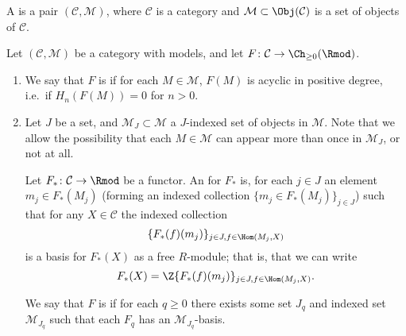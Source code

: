 \documentclass[main.tex]{subfiles}
\begin{document}
\begin{definition}
  \label{def:category_with_models}
  A  is a pair $(\mathcal{C}, \mathcal{M})$, where $\mathcal{C}$ is a category and $\mathcal{M} \subset \Obj(\mathcal{C})$ is a set of objects of $\mathcal{C}$.
\end{definition}

\begin{definition}
  \label{def:free_acyclic_functor}
  Let $(\mathcal{C}, \mathcal{M})$ be a category with models, and let $F\colon \mathcal{C} \to \Ch_{\geq 0}(\Rmod)$.

  \begin{enumerate}
    \item We say that $F$ is  if for each $M \in \mathcal{M}$, $F(M)$ is acyclic in positive degree, i.e.\ if $H_{n}(F(M)) = 0$ for $n > 0$.

    \item Let $J$ be a set, and $\mathcal{M}_{J} \subset \mathcal{M}$ a $J$-indexed set of objects in $\mathcal{M}$. Note that we allow the possibility that each $M \in \mathcal{M}$ can appear more than once in \(\mathcal{M}_{J}\), or not at all.

      Let $F_{*}\colon \mathcal{C} \to \Rmod$ be a functor. An  for $F_{*}$ is, for each $j \in J$ an element $m_{j} \in F_{*}(M_{j})$ (forming an indexed collection $\{m_{j} \in F_{*}(M_{j})\}_{j \in J}$) such that for any $X \in \mathcal{C}$ the indexed collection
      \begin{equation*}
        \{F_{*}(f)(m_{j})\}_{j \in J, f \in \Hom(M_{j}, X)}
      \end{equation*}
      is a basis for $F_{*}(X)$ as a free $R$-module; that is, that we can write
      \begin{equation*}
        F_{*}(X) = \Z\{F_{*}(f)(m_{j})\}_{j \in J, f \in \Hom(M_{j}, X)}.
      \end{equation*}

      We say that $F$ is  if for each $q \geq 0$ there exists some set $J_{q}$ and indexed set $\mathcal{M}_{J_{q}}$ such that each $F_{q}$ has an $\mathcal{M}_{J_{q}}$-basis.
  \end{enumerate}
\end{definition}
\end{document}
